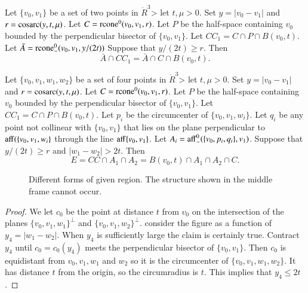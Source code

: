 \newpage

\begin{lemma}
Let $\{v_0,v_1\}$ be a set of two points in $\ring{R}^3$>
let $t,\mu > 0$.  Set $y=|v_0-v_1|$
and $r={\operatorname{cosarc}}(y,t,\mu)$.
Let $C={\operatorname{rcone}}^0(v_0,v_1,r)$.
Let $P$ be the half-space containing $v_0$ bounded by
the perpendicular bisector of  $\{v_0,v_1\}$.
Let $CC_1 = C\cap P \cap B(v_0,t)$.
Let $\bar A = {\operatorname{rcone}}^0_-(v_0,v_1,y/(2t))$
Suppose that $y/(2t) \ge r$.
Then
  $$
  \bar A \cap CC_1 = \bar A \cap C \cap B(v_0,t).
  $$
\end{lemma}

\newpage

\begin{lemma}
Let $\{v_0,v_1,w_1,w_2\}$ be a set of four points in $\ring{R}^3$>
let $t,\mu > 0$.  Set $y=|v_0-v_1|$
and $r={\operatorname{cosarc}}(y,t,\mu)$.
Let $C={\operatorname{rcone}}^0(v_0,v_1,r)$.
Let $P$ be the half-space containing $v_0$ bounded by
the perpendicular bisector of  $\{v_0,v_1\}$.
Let $CC_1 = C\cap P \cap B(v_0,t)$.
Let $p_i$ be the circumcenter of $\{v_0,v_1,w_i\}$.  Let
$q_i$ be any point not collinear with $\{v_0,v_1\}$ that
lies on the plane perpendicular to ${\operatorname{aff}}(\{v_0,v_1,w_i\}$
through the line ${\operatorname{aff}}\{v_0,v_1\}$.
Let $A_i = {\operatorname{aff}}_-^0(\{v_0,p_i,q_i\},v_1)$.
Suppose that $y/(2t) \ge r$ and $|w_1-w_2| > 2t$.
Then
  $$ E = 
  CC \cap A_1\cap A_2 = 
  B(v_0,t) \cap A_1 \cap A_2 \cap C.
  $$
\end{lemma}

\begin{figure}[htb]
  \centering
  \caption{Different forms of given region.   The
  structure shown in the middle frame cannot occur.}
\end{figure}


\begin{proof}
We let $c_0$ be the point at distance $t$ from $v_0$ 
on the intersection of the
planes $\{v_0,v_1,w_1\}^\perp$ and $\{v_0,v_1,w_2\}^\perp$. 
consider the figure as a function of $y_4=|w_1-w_2|$. When $y_4$ is
sufficiently large the claim is certainly true.  Contract $y_4$ until
$c_0=c_0(y_4)$ meets the perpendicular bisector of $\{v_0,v_1\}$. Then $c_0$
is equidistant from $v_0,v_1,w_1$ and $w_2$ so it is the circumcenter of
$\{v_0,v_1,w_1,w_2\}$. It has distance $t$ from the origin, so the
circumradius is $t$. This implies that $y_4\le 2t$.
\end{proof}


